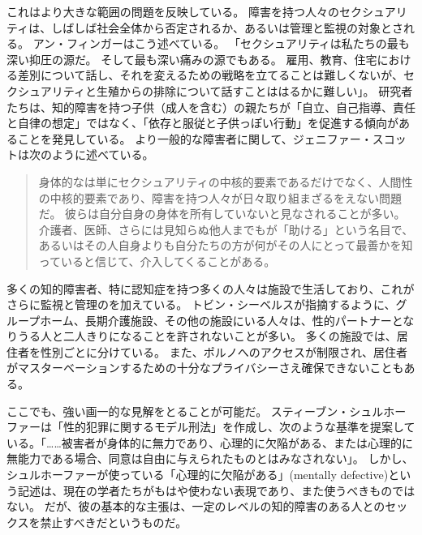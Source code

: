 \documentclass[paper=a4,book,openany]{jlreq}
\begin{document}
これはより大きな範囲の問題を反映している。
障害を持つ人々のセクシュアリティは、しばしば社会全体から否定されるか、あるいは管理と監視の対象とされる。
アン・フィンガーはこう述べている。
「セクシュアリティは私たちの最も深い抑圧の源だ。
そして最も深い痛みの源でもある。
雇用、教育、住宅における差別について話し、それを変えるための戦略を立てることは難しくないが、セクシュアリティと生殖からの排除について話すことははるかに難しい」\citep[p.9]{finger92:_forbid_fruit}。
研究者たちは、知的障害を持つ子供（成人を含む）の親たちが「自立、自己指導、責任と自律の想定」ではなく、「依存と服従と子供っぽい行動」を促進する傾向があることを発見している\citep[p.196]{mill10:_negot_auton_famil}。
より一般的な障害者に関して、ジェニファー・スコットは次のように述べている。

\begin{quote}
身体的なは単にセクシュアリティの中核的要素であるだけでなく、人間性の中核的要素であり、障害を持つ人々が日々取り組まざるをえない問題だ。
彼らは自分自身の身体を所有していないと見なされることが多い。
介護者、医師、さらには見知らぬ他人までもが「助ける」という名目で、あるいはその人自身よりも自分たちの方が何がその人にとって最善かを知っていると信じて、介入してくることがある。
\citep[p.218]{scott15:_can_disab_peopl_have_sex}
\end{quote}

多くの知的障害者、特に認知症を持つ多くの人々は施設で生活しており、これがさらに監視と管理のを加えている。
トビン・シーベルスが指摘するように、グループホーム、長期介護施設、その他の施設にいる人々は、性的パートナーとなりうる人と二人きりになることを許されないことが多い。
多くの施設では、居住者を性別ごとに分けている。
また、ポルノへのアクセスが制限され、居住者がマスターベーションするための十分なプライバシーさえ確保できないこともある\citep[p.45]{siebers12:_sexual_cultur_disab_peopl}。

ここでも、強い画一的な見解をとることが可能だ。
スティーブン・シュルホーファーは「性的犯罪に関するモデル刑法」を作成し、次のような基準を提案している。「……被害者が身体的に無力であり、心理的に欠陥がある、または心理的に無能力である場合、同意は自由に与えられたものとはみなされない」\citep[p.283]{schulhofer98:_unwan_sex}。
しかし、シュルホーファーが使っている「心理的に欠陥がある」(mentally defective)という記述は、現在の学者たちがもはや使わない表現であり、また使うべきものではない。
だが、彼の基本的な主張は、一定のレベルの知的障害のある人とのセックスを禁止すべきだというものだ。
\end{document}
